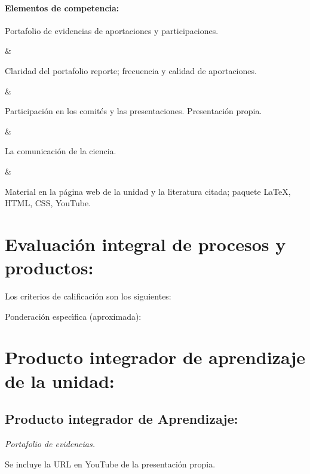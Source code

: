 \paragraph{Elementos de competencia:}

\quad



Portafolio de evidencias de aportaciones y participaciones.

&

Claridad del portafolio reporte; frecuencia y calidad de aportaciones.

&

Participaci\'{o}n en los comit\'{e}s y las
presentaciones. Presentaci\'{o}n propia.

&

La comunicaci\'{o}n de la ciencia.

&

Material en la p\'{a}gina web de la unidad y la literatura citada;
paquete {\LaTeX}, HTML, CSS, YouTube.



\newpage

\section{Evaluaci\'{o}n integral de procesos y productos:}

Los criterios de calificaci\'{o}n son los siguientes:

  
Ponderaci\'{o}n espec\'{\i}fica (aproximada):

 

\section{Producto integrador de aprendizaje de la unidad:}

\subsection{Producto integrador de Aprendizaje:}

{\em Portafolio de evidencias.}

Se incluye la URL en YouTube de la presentaci\'{o}n propia.


